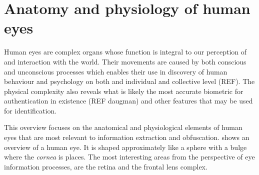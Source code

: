 




\section{Anatomy and physiology of human eyes}
Human eyes are complex organs whose function is integral to our perception of and interaction with the world. Their movements are caused by both conscious and unconscious processes which enables their use in discovery of human behaviour and psychology on both and individual and collective level (REF). The physical complexity also reveals what is likely the most accurate biometric for authentication in existence (REF daugman) and other features that may be used for identification. 

This overview focuses on the anatomical and physiological elements of human eyes that are most relevant to information extraction and obfuscation.  shows an overview of a human eye. It is shaped approximately like a sphere with a bulge where the \emph{cornea} is places. The most interesting areas from the perspective of eye information processes, are the retina and the frontal lens complex. 



